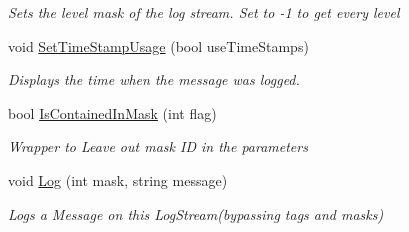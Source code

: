 \begin{DoxyCompactItemize}
\begin{DoxyCompactList}\small\item\em Sets the level mask of the log stream. Set to -\/1 to get every level \end{DoxyCompactList}\item 
void \mbox{\hyperlink{class_a_d_l_1_1_log_stream_a533f3bae752ab3ee1c3f1aaac23a7d05}{Set\+Time\+Stamp\+Usage}} (bool use\+Time\+Stamps)
\begin{DoxyCompactList}\small\item\em Displays the time when the message was logged. \end{DoxyCompactList}\item 
bool \mbox{\hyperlink{class_a_d_l_1_1_log_stream_af0d0bf45e8803e9d5185660374f7eb96}{Is\+Contained\+In\+Mask}} (int flag)
\begin{DoxyCompactList}\small\item\em Wrapper to Leave out mask ID in the parameters \end{DoxyCompactList}\item 
void \mbox{\hyperlink{class_a_d_l_1_1_log_stream_a66b291a45dd593bf5b390eb82602b7ab}{Log}} (int mask, string message)
\begin{DoxyCompactList}\small\item\em Logs a Message on this Log\+Stream(bypassing tags and masks) \end{DoxyCompactList}\end{DoxyCompactItemize}
